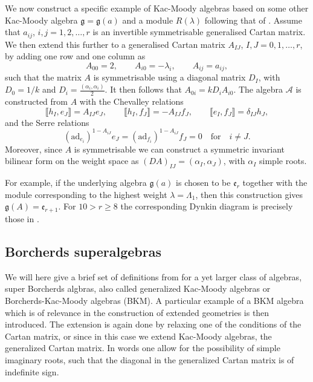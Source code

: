 We now construct a specific example of Kac-Moody algebras based on some other Kac-Moody algebra $\mathfrak{g}=\mathfrak{g}(a)$ and a module $R(\lambda)$ following that of \cite{CederwallPalmkvist2017}. Assume that $a_{ij}$, $i,j=1,2,\ldots,r$ is an invertible symmetrisable generalised Cartan matrix. We then extend this further to a generalised Cartan matrix $A_{IJ}$, $I,J=0,1,\ldots,r$, by adding one row and one column as 
\begin{equation}
    A_{00}=2,\qquad A_{i0} = -\lambda_i,\qquad A_{ij} = a_{ij},
\end{equation}
such that the matrix $A$ is symmetrisable using a diagonal matrix $D_I$, with $D_0=1/k$ and $D_i = \frac{(\alpha_i,\alpha_i)}{2}$. It then follows that $A_{0i}=kD_iA_{i0}$. The algebra $\mathscr{A}$ is constructed from $A$ with the Chevalley relations 
\begin{equation}
    \llbracket h_I,e_J\rrbracket = A_{IJ}e_J,\qquad \llbracket h_I,f_J\rrbracket = -A_{IJ}f_J,\qquad \llbracket e_I,f_J\rrbracket = \delta_{IJ}h_J,
\end{equation}
and the Serre relations 
\begin{equation}\label{eq:SerreKacMoody}
    (\text{ad}_{e_i})^{1-A_{iJ}}e_J = (\text{ad}_{f_i})^{1-A_{iJ}}f_J = 0 \quad \text{for} \quad i\neq J.
\end{equation}
Moreover, since $A$ is symmetrisable we can construct a symmetric invariant bilinear form on the weight space as $(DA)_{IJ}=(\alpha_I,\alpha_J)$, with $\alpha_I$ simple roots. 

For example, if the underlying algebra $\mathfrak{g}(a)$ is chosen to be $\mathfrak{e}_r$ together with the module corresponding to the highest weight $\lambda =\Lambda_1$, then this construction gives $\mathfrak{g}(A)=\mathfrak{e}_{r+1}$. For $10>r\geq 8$ the corresponding Dynkin diagram is precisely those in . 

\subsection{Borcherds superalgebras}\label{sec:Borcherds}

We will here give a brief set of definitions from \cite{Ray2006} for a yet larger class of algebras, super Borcherds algbras, also called generalized Kac-Moody algebras or Borcherds-Kac-Moody algebras (BKM). A particular example of a BKM algebra which is of relevance in the construction of extended geometries is then introduced. The extension is again done by relaxing one of the conditions of the Cartan matrix, or since in this case we extend Kac-Moody algebras, the generalized Cartan matrix. In words one allow for the possibility of simple imaginary roots, such that the diagonal in the generalized Cartan matrix is of indefinite sign.

